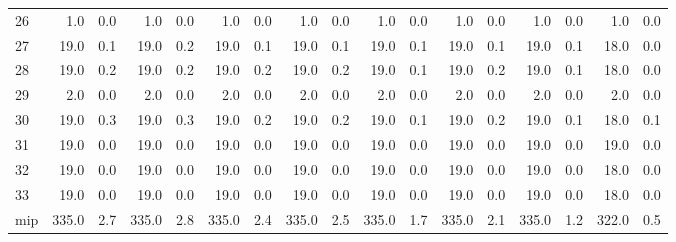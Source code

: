 \begin{tabular}{lrrrrrrrrrrrrrrrr}
     26 &   1.0 &   0.0 &   1.0 &     0.0 &   1.0 &     0.0 &   1.0 &     0.0 &   1.0 &     0.0 &   1.0 &     0.0 &   1.0 &     0.0 &   1.0 &     0.0 \\
     27 &  19.0 &   0.1 &  19.0 &     0.2 &  19.0 &     0.1 &  19.0 &     0.1 &  19.0 &     0.1 &  19.0 &     0.1 &  19.0 &     0.1 &  18.0 &     0.0 \\
     28 &  19.0 &   0.2 &  19.0 &     0.2 &  19.0 &     0.2 &  19.0 &     0.2 &  19.0 &     0.1 &  19.0 &     0.2 &  19.0 &     0.1 &  18.0 &     0.0 \\
     29 &   2.0 &   0.0 &   2.0 &     0.0 &   2.0 &     0.0 &   2.0 &     0.0 &   2.0 &     0.0 &   2.0 &     0.0 &   2.0 &     0.0 &   2.0 &     0.0 \\
     30 &  19.0 &   0.3 &  19.0 &     0.3 &  19.0 &     0.2 &  19.0 &     0.2 &  19.0 &     0.1 &  19.0 &     0.2 &  19.0 &     0.1 &  18.0 &     0.1 \\
     31 &  19.0 &   0.0 &  19.0 &     0.0 &  19.0 &     0.0 &  19.0 &     0.0 &  19.0 &     0.0 &  19.0 &     0.0 &  19.0 &     0.0 &  19.0 &     0.0 \\
     32 &  19.0 &   0.0 &  19.0 &     0.0 &  19.0 &     0.0 &  19.0 &     0.0 &  19.0 &     0.0 &  19.0 &     0.0 &  19.0 &     0.0 &  18.0 &     0.0 \\
     33 &  19.0 &   0.0 &  19.0 &     0.0 &  19.0 &     0.0 &  19.0 &     0.0 &  19.0 &     0.0 &  19.0 &     0.0 &  19.0 &     0.0 &  18.0 &     0.0 \\
    mip & 335.0 &   2.7 & 335.0 &     2.8 & 335.0 &     2.4 & 335.0 &     2.5 & 335.0 &     1.7 & 335.0 &     2.1 & 335.0 &     1.2 & 322.0 &     0.5 \\
\bottomrule
\end{tabular}
